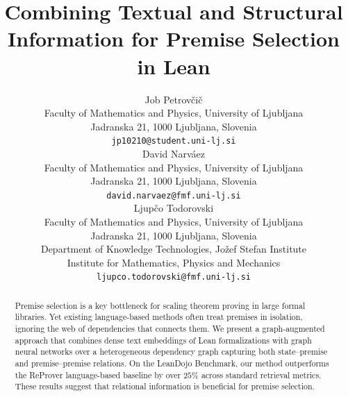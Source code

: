 \documentclass{article}
\title{Combining Textual and Structural Information for Premise Selection in Lean}
\author{%
  Job Petrovčič \\
  Faculty of Mathematics and Physics, University of Ljubljana\\
  Jadranska 21, 1000 Ljubljana, Slovenia \\
  \texttt{jp10210@student.uni-lj.si} \\
  \And
  David Narváez \\
  Faculty of Mathematics and Physics, University of Ljubljana\\
  Jadranska 21, 1000 Ljubljana, Slovenia \\
  \texttt{david.narvaez@fmf.uni-lj.si} \\
  \And
  Ljupčo Todorovski \\
  Faculty of Mathematics and Physics, University of Ljubljana\\
  Jadranska 21, 1000 Ljubljana, Slovenia \\
  Department of Knowledge Technologies, Jožef Stefan Institute \\
  Institute for Mathematics, Physics and Mechanics \\
  \texttt{ljupco.todorovski@fmf.uni-lj.si} \\
}
\begin{document}
\maketitle


\begin{abstract}
Premise selection is a key bottleneck for scaling theorem proving in large formal libraries. Yet existing language-based methods often treat premises in isolation, ignoring the web of dependencies that connects them. We present a graph-augmented approach that combines dense text embeddings of Lean formalizations with graph neural networks over a heterogeneous dependency graph capturing both state–premise and premise–premise relations. On the LeanDojo Benchmark, our method outperforms the ReProver language-based baseline by over $25\%$ across standard retrieval metrics. These results suggest that relational information is beneficial for premise selection.
\end{abstract}



\end{document}
